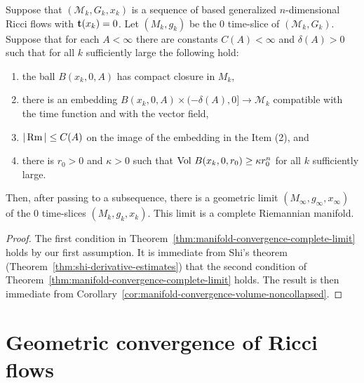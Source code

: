 \begin{theorem}\label{thm:ricci-flow-slice-convergence}

\label{sliceconv}

Suppose that $({\mathcal M}_k,G_k,x_k)$ is a sequence of based
generalized $n$-dimensional Ricci flows with ${\bf t}(x_k)=0$. Let
$(M_k,g_k)$ be the $0$ time-slice of $({\mathcal M}_k,G_k)$. Suppose
that for each $A<\infty$ there are constants $C(A)<\infty$ and
$\delta(A)>0$ such that for all $k$ sufficiently large the following
hold:
\begin{enumerate}
\item[(1)] the ball $B(x_k,0,A)$ has compact closure in $M_k$,
\item[(2)] there is an embedding $B(x_k,0,A)\times (-\delta(A),0]\to {\mathcal M}_k$ compatible with
the time function and with the vector field, \item[(3)]   $|\operatorname{Rm}|\le C(A)$
on the image of the embedding in the Item (2), and \item[(4)] there is $r_0>0$
and $\kappa>0$ such that $\operatorname{Vol}\,B(x_k,0,r_0)\ge \kappa r_0^n$ for all $k$
sufficiently large.
\end{enumerate} Then, after passing to a
subsequence, there is a geometric limit
$(M_\infty,g_\infty,x_\infty)$ of the $0$ time-slices
$(M_k,g_k,x_k)$. This limit is a complete Riemannian manifold.
\end{theorem}


\begin{proof}
\sketch
{}
The first condition in Theorem~\ref{thm:manifold-convergence-complete-limit} holds by our first
assumption. It is immediate from Shi's theorem (Theorem~\ref{thm:shi-derivative-estimates})
that the second condition of Theorem~\ref{thm:manifold-convergence-complete-limit} holds. The result
is then immediate from Corollary~\ref{cor:manifold-convergence-volume-noncollapsed}.
\end{proof}


\section{Geometric convergence of Ricci flows}




